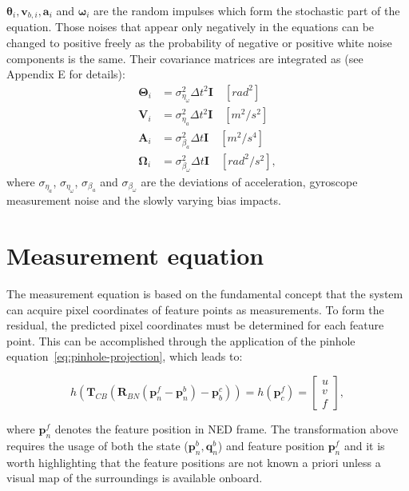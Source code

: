 $\boldsymbol{\theta}_i,\mathbf{v}_{b,i},\mathbf{a}_i$ and $\boldsymbol{\omega}_i$ are the random impulses which form the stochastic part of the equation. Those noises that appear only negatively in the equations can be changed to positive freely as the probability of negative or positive white noise components is the same. Their covariance matrices are integrated as (see~\cite{quaternion-eskf} Appendix E for details):
\begin{equation}
\begin{aligned}
    \boldsymbol{\Theta}_i&=\sigma_{\eta_\omega}^2\Delta t^2\mathbf{I} \quad [rad^2] \\
    \mathbf{V}_i&=\sigma_{\eta_a}^2\Delta t^2\mathbf{I} \quad [m^2/s^2]\\
    \mathbf{A}_i&=\sigma_{\beta_a}^2\Delta t\mathbf{I} \quad [m^2/s^4]\\
    \boldsymbol{\Omega}_i&=\sigma_{\beta_\omega}^2\Delta t\mathbf{I} \quad [rad^2/s^2],
\end{aligned}\label{eq:noises}
\end{equation}
where $\sigma_{\eta_a}$, $\sigma_{\eta_\omega}$, $\sigma_{\beta_a}$ and $\sigma_{\beta_\omega}$ are the deviations of acceleration, gyroscope measurement noise and the slowly varying bias impacts.

\section{Measurement equation}

The measurement equation is based on the fundamental concept that the system can acquire pixel coordinates of feature points as measurements. To form the residual, the predicted pixel coordinates must be determined for each feature point. This can be accomplished through the application of the pinhole equation~\eqref{eq:pinhole-projection}, which leads to:

\begin{equation}
    h(\mathbf{T}_{CB}(\mathbf{R}_{BN}(\mathbf{p}_n^f-\mathbf{p}_n^b)-\mathbf{p}_b^c))=
    h(\mathbf{p}_c^f)=
    \begin{bmatrix}
        u \\ v \\ f
    \end{bmatrix}, 
\end{equation}

where $\mathbf{p}_n^f$ denotes the feature position in NED frame. The transformation above requires the usage of both the state ($\mathbf{p}_n^b, \mathbf{q}_n^b$) and feature position $\mathbf{p}_n^f$ and it is worth highlighting that the feature positions are not known a priori unless a visual map of the surroundings is available onboard.

